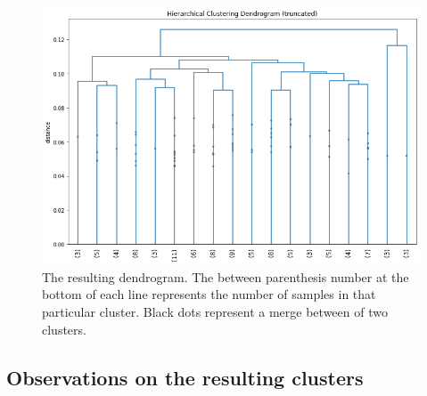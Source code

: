 \documentclass[a4paper]{report}
\begin{document}
\begin{figure} [H]
    \centering
    \includegraphics [width=\textwidth]{o/clustering.png}
    \caption{The resulting dendrogram. The between parenthesis number at the bottom of each line represents the number of samples in that particular cluster. Black dots represent a merge between of two clusters.}
    \label{clustering}
\end{figure}

\subsection{Observations on the resulting clusters}
\end{document}
